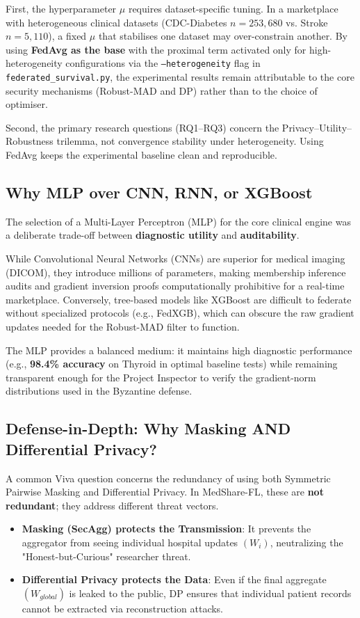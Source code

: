 \documentclass[10pt, a4paper, twocolumn]{article}
\begin{document}
First, the hyperparameter $\mu$ requires dataset-specific tuning. In a marketplace with heterogeneous clinical datasets (CDC-Diabetes $n=253,680$ vs. Stroke $n=5,110$), a fixed $\mu$ that stabilises one dataset may over-constrain another. By using \textbf{FedAvg as the base} with the proximal term activated only for high-heterogeneity configurations via the \texttt{--heterogeneity} flag in \texttt{federated\_survival.py}, the experimental results remain attributable to the core security mechanisms (Robust-MAD and DP) rather than to the choice of optimiser.

Second, the primary research questions (RQ1--RQ3) concern the Privacy--Utility--Robustness trilemma, not convergence stability under heterogeneity. Using FedAvg keeps the experimental baseline clean and reproducible.

\subsection{Why MLP over CNN, RNN, or XGBoost}
The selection of a Multi-Layer Perceptron (MLP) for the core clinical engine was a deliberate trade-off between \textbf{diagnostic utility} and \textbf{auditability}. 

While Convolutional Neural Networks (CNNs) are superior for medical imaging (DICOM), they introduce millions of parameters, making membership inference audits and gradient inversion proofs computationally prohibitive for a real-time marketplace. Conversely, tree-based models like XGBoost are difficult to federate without specialized protocols (e.g., FedXGB), which can obscure the raw gradient updates needed for the Robust-MAD filter to function. 

The MLP provides a balanced medium: it maintains high diagnostic performance (e.g., \textbf{98.4\% accuracy} on Thyroid in optimal baseline tests) while remaining transparent enough for the Project Inspector to verify the gradient-norm distributions used in the Byzantine defense.

\subsection{Defense-in-Depth: Why Masking AND Differential Privacy?}
A common Viva question concerns the redundancy of using both Symmetric Pairwise Masking and Differential Privacy. In MedShare-FL, these are \textbf{not redundant}; they address different threat vectors.

\begin{itemize}
    \item \textbf{Masking (SecAgg) protects the Transmission}: It prevents the aggregator from seeing individual hospital updates $(W_i)$, neutralizing the "Honest-but-Curious" researcher threat.
    \item \textbf{Differential Privacy protects the Data}: Even if the final aggregate $(W_{global})$ is leaked to the public, DP ensures that individual patient records cannot be extracted via reconstruction attacks.
\end{itemize}
\end{document}
